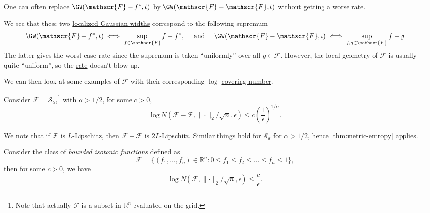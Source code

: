 \begin{remark}
	One can often replace \(\GW(\mathscr{F} - f^{\ast} , t) \) by \(\GW(\mathscr{F} - \mathscr{F} , t) \) without getting a worse \hyperref[def:rate-of-convergence]{rate}.
\end{remark}
\begin{explanation}
	We see that these two \hyperref[def:localized-Gaussian-width]{localized Gaussian widths} correspond to the following supremum
	\[
		\GW(\mathscr{F} - f^{\ast} , t)   \iff \sup _{f\in \mathscr{F} } f - f^{\ast}, \quad \text{ and } \quad
		\GW(\mathscr{F} - \mathscr{F} , t) \iff \sup _{f, g \in \mathscr{F} } f - g
	\]
	The latter gives the worst case rate since the supremum is taken ``uniformly'' over all \(g\in \mathscr{F} \). However, the local geometry of \(\mathscr{F} \) is usually quite ``uniform'', so the \hyperref[def:rate-of-convergence]{rate} doesn't blow up.
\end{explanation}

We can then look at some examples of \(\mathscr{F} \) with their corresponding \(\log \)-\hyperref[def:covering-number]{covering number}.

\begin{eg}
	Consider \(\mathscr{F} = \mathcal{S} _\alpha \),\footnote{Note that actually \(\mathscr{F} \) is a subset in \(\mathbb{R} ^n\) evaluated on the grid.} with \(\alpha > 1 / 2\), for some \(c > 0\),
	\[
		\log N(\mathscr{F} - \mathscr{F} , \lVert \cdot \rVert _2 / \sqrt{n} , \epsilon ) \leq c \left( \frac{1}{\epsilon } \right) ^{1 / \alpha }.
	\]
\end{eg}
\begin{explanation}
	We note that if \(\mathscr{F} \) is \(L\)-Lipschitz, then \(\mathscr{F} - \mathscr{F} \) is \(2L\)-Lipschitz. Similar things hold for \(\mathcal{S} _\alpha \) for \(\alpha > 1 / 2\), hence \autoref{thm:metric-entropy} applies.
\end{explanation}

\begin{eg}
	Consider the class of \emph{bounded isotonic functions} defined as
	\[
		\mathscr{F} = \{(f_1, \dots , f_n) \in \mathbb{R} ^n \colon 0 \leq f_1 \leq f_2 \leq \dots \leq f_n \leq 1 \},
	\]
	then for some \(c > 0\), we have
	\[
		\log N(\mathscr{F} , \lVert \cdot \rVert _2 / \sqrt{n} , \epsilon ) \leq \frac{c}{\epsilon }.
	\]
\end{eg}

